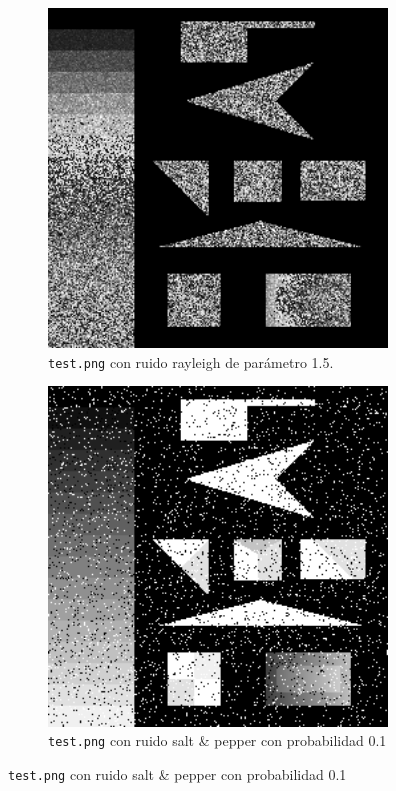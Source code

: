 \documentclass[11pt, spanish]{article}
\begin{document}
\begin{figure}[H]
\centering
\begin{subfigure}{0.5\linewidth}
\centering
  \includegraphics[height=9cm]{ej1-imgs/test-rayleigh15.png}
  \caption{\footnotesize{\texttt{test.png} con ruido rayleigh de parámetro 1.5.}}
\end{subfigure}%
\begin{subfigure}{0.5\linewidth}
\centering
  \includegraphics[height=9cm]{ej1-imgs/test-saltpepper10.png}
  \caption{\footnotesize{\texttt{test.png} con ruido salt \& pepper con probabilidad 0.1}}
\end{subfigure}
\end{figure}
\end{document}
